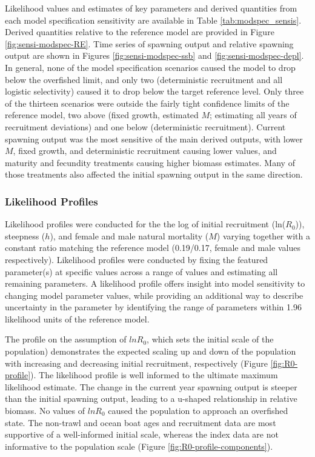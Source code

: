 \documentclass[11pt,
  english,
  letterpaper,
]{article}
\begin{document}
Likelihood values and estimates of key parameters and derived quantities from each model specification sensitivity are available in Table \ref{tab:modspec_sensis}. Derived quantities relative to the reference model are provided in Figure \ref{fig:sensi-modspec-RE}. Time series of spawning output and relative spawning output are shown in Figures \ref{fig:sensi-modspec-ssb} and \ref{fig:sensi-modspec-depl}. In general, none of the model specification scenarios caused the model to drop below the overfished limit, and only two (deterministic recruitment and all logistic selectivity) caused it to drop below the target reference level. Only three of the thirteen scenarios were outside the fairly tight confidence limits of the reference model, two above (fixed growth, estimated \(M\); estimating all years of recruitment deviations) and one below (deterministic recruitment). Current spawning output was the most sensitive of the main derived outputs, with lower \(M\), fixed growth, and deterministic recruitment causing lower values, and maturity and fecundity treatments causing higher biomass estimates. Many of those treatments also affected the initial spawning output in the same direction.

\hypertarget{likelihood-profiles-1}{%
\subsubsection{Likelihood Profiles}\label{likelihood-profiles-1}}

Likelihood profiles were conducted for the the log of initial recruitment (ln(\(R_0\))), steepness (\(h\)), and female and male natural mortality (\(M\)) varying together with a constant ratio matching the reference model (0.19/0.17, female and male values respectively). Likelihood profiles were conducted by fixing the featured parameter(s) at specific values across a range of values and estimating all remaining parameters. A likelihood profile offers insight into model sensitivity to changing model parameter values, while providing an additional way to describe uncertainty in the parameter by identifying the range of parameters within 1.96 likelihood units of the reference model.

The profile on the assumption of \(lnR_0\), which sets the initial scale of the population) demonstrates the expected scaling up and down of the population with increasing and decreasing initial recruitment, respectively (Figure \ref{fig:R0-profile}). The likelihood profile is well informed to the ultimate maximum likelihood estimate. The change in the current year spawning output is steeper than the initial spawning output, leading to a u-shaped relationship in relative biomass. No values of \(lnR_0\) caused the population to approach an overfished state. The non-trawl and ocean boat ages and recruitment data are most supportive of a well-informed initial scale, whereas the index data are not informative to the population scale (Figure \ref{fig:R0-profile-components}).
\end{document}
